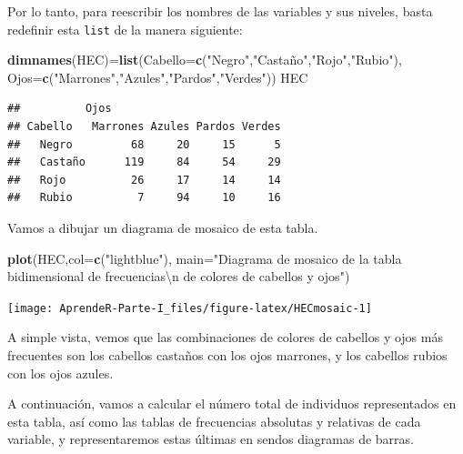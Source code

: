 \documentclass[]{book}
\newenvironment{Shaded}{\begin{snugshade}}{\end{snugshade}}
\newcommand{\CharTok}[1]{\textcolor[rgb]{0.31,0.60,0.02}{#1}}
\newcommand{\DataTypeTok}[1]{\textcolor[rgb]{0.13,0.29,0.53}{#1}}
\newcommand{\KeywordTok}[1]{\textcolor[rgb]{0.13,0.29,0.53}{\textbf{#1}}}
\newcommand{\NormalTok}[1]{#1}
\newcommand{\StringTok}[1]{\textcolor[rgb]{0.31,0.60,0.02}{#1}}
\theoremstyle{definition}
\theoremstyle{definition}
\theoremstyle{definition}
\theoremstyle{remark}
\begin{document}
Por lo tanto, para reescribir los nombres de las variables y sus niveles, basta redefinir esta \texttt{list} de la manera siguiente:

\begin{Shaded}
\begin{Highlighting}[]
\KeywordTok{dimnames}\NormalTok{(HEC)=}\KeywordTok{list}\NormalTok{(}\DataTypeTok{Cabello=}\KeywordTok{c}\NormalTok{(}\StringTok{"Negro"}\NormalTok{,}\StringTok{"Castaño"}\NormalTok{,}\StringTok{"Rojo"}\NormalTok{,}\StringTok{"Rubio"}\NormalTok{), }\DataTypeTok{Ojos=}\KeywordTok{c}\NormalTok{(}\StringTok{"Marrones"}\NormalTok{,}\StringTok{"Azules"}\NormalTok{,}\StringTok{"Pardos"}\NormalTok{,}\StringTok{"Verdes"}\NormalTok{))}
\NormalTok{HEC}
\end{Highlighting}
\end{Shaded}

\begin{verbatim}
##          Ojos
## Cabello   Marrones Azules Pardos Verdes
##   Negro         68     20     15      5
##   Castaño      119     84     54     29
##   Rojo          26     17     14     14
##   Rubio          7     94     10     16
\end{verbatim}

Vamos a dibujar un diagrama de mosaico de esta tabla.

\begin{Shaded}
\begin{Highlighting}[]
\KeywordTok{plot}\NormalTok{(HEC,}\DataTypeTok{col=}\KeywordTok{c}\NormalTok{(}\StringTok{"lightblue"}\NormalTok{),}
     \DataTypeTok{main=}\StringTok{"Diagrama de mosaico de la tabla bidimensional de frecuencias}\CharTok{\textbackslash{}n}\StringTok{ de colores de cabellos y ojos"}\NormalTok{)}
\end{Highlighting}
\end{Shaded}

\begin{center}\texttt{[image: AprendeR-Parte-I\_files/figure-latex/HECmosaic-1]} \end{center}

A simple vista, vemos que las combinaciones de colores de cabellos y ojos más frecuentes son
los cabellos castaños con los ojos marrones, y los cabellos rubios con los ojos azules.

A continuación, vamos a calcular el número total de individuos representados en esta tabla, así como las tablas de frecuencias absolutas y relativas de cada variable, y representaremos estas últimas en sendos diagramas de barras.
\end{document}

